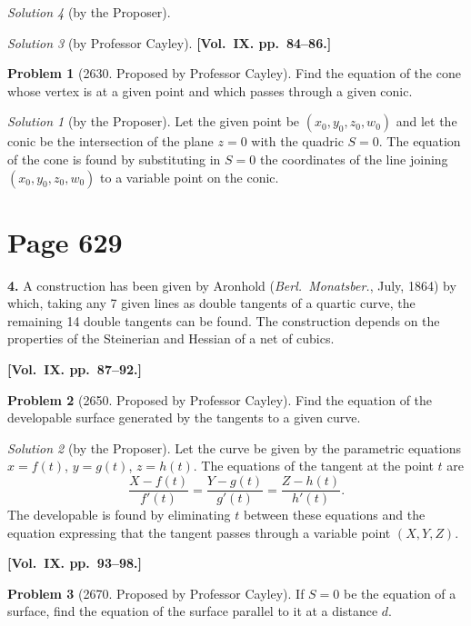 \documentclass[12pt,a4paper]{article}
\theoremstyle{plain}
\theoremstyle{definition}
\newtheorem{problem}{Problem}
\theoremstyle{remark}
\newtheorem*{solution}{Solution}
\begin{document}
\begin{solution}[by the Proposer]
\begin{solution}[by Professor Cayley]
\medskip\noindent\textbf{[Vol.~IX. pp.~84--86.]}

\begin{problem}[2630. Proposed by Professor Cayley]
Find the equation of the cone whose vertex is at a given point and which passes through a given conic.
\end{problem}

\begin{solution}[by the Proposer]
Let the given point be $(x_0, y_0, z_0, w_0)$ and let the conic be the intersection of the plane $z = 0$ with the quadric $S = 0$. The equation of the cone is found by substituting in $S = 0$ the coordinates of the line joining $(x_0, y_0, z_0, w_0)$ to a variable point on the conic.
\end{solution}

\section*{Page 629}
\setcounter{page}{629}

\textbf{4.} A construction has been given by Aronhold (\textit{Berl.~Monatsber.}, July, 1864) by which, taking any 7 given lines as double tangents of a quartic curve, the remaining 14 double tangents can be found. The construction depends on the properties of the Steinerian and Hessian of a net of cubics.

\medskip\noindent\textbf{[Vol.~IX. pp.~87--92.]}

\begin{problem}[2650. Proposed by Professor Cayley]
Find the equation of the developable surface generated by the tangents to a given curve.
\end{problem}

\begin{solution}[by the Proposer]
Let the curve be given by the parametric equations $x = f(t)$, $y = g(t)$, $z = h(t)$. The equations of the tangent at the point $t$ are
\[
\frac{X - f(t)}{f'(t)} = \frac{Y - g(t)}{g'(t)} = \frac{Z - h(t)}{h'(t)}.
\]
The developable is found by eliminating $t$ between these equations and the equation expressing that the tangent passes through a variable point $(X, Y, Z)$.
\end{solution}

\medskip\noindent\textbf{[Vol.~IX. pp.~93--98.]}

\begin{problem}[2670. Proposed by Professor Cayley]
If $S = 0$ be the equation of a surface, find the equation of the surface parallel to it at a distance $d$.
\end{problem}


\end{solution}
\end{solution}
\end{document}
